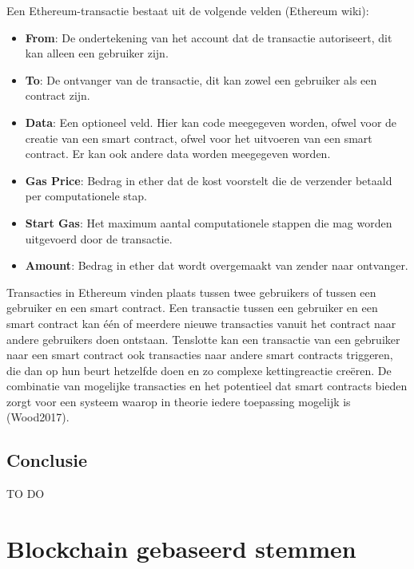 		Een Ethereum-transactie bestaat uit de volgende velden (Ethereum wiki):
		\begin{itemize}
			\item \textbf{From}: De ondertekening van het account dat de transactie autoriseert, dit kan alleen een gebruiker zijn.
			\item \textbf{To}: De ontvanger van de transactie, dit kan zowel een gebruiker als een contract zijn. 
			\item \textbf{Data}: Een optioneel veld. Hier  kan code meegegeven worden, ofwel voor de creatie van een smart contract, ofwel voor het uitvoeren van een smart contract.
Er kan ook andere data worden meegegeven worden.
			\item \textbf{Gas Price}: Bedrag in ether dat de kost voorstelt die de verzender betaald per computationele stap.
			\item \textbf{Start Gas}: Het maximum aantal computationele stappen die mag worden uitgevoerd door de transactie.
			\item \textbf{Amount}: Bedrag in ether dat wordt overgemaakt van zender naar ontvanger.
		\end{itemize}	
		Transacties in Ethereum vinden plaats tussen twee gebruikers of tussen een gebruiker en een smart contract. Een transactie tussen een gebruiker en een smart contract kan één of meerdere nieuwe transacties vanuit het contract naar andere gebruikers doen ontstaan. Tenslotte kan een transactie van een gebruiker naar een smart contract ook transacties naar andere smart contracts triggeren, die dan op hun beurt hetzelfde doen en zo complexe kettingreactie creëren. De combinatie van mogelijke transacties en het potentieel dat smart contracts bieden zorgt voor een systeem waarop in theorie iedere toepassing mogelijk is (Wood2017). 
	\subsection{Conclusie}
		TO DO
\section{Blockchain gebaseerd stemmen}
\label{sec:blockchain-gebaseerd-stemmen}
